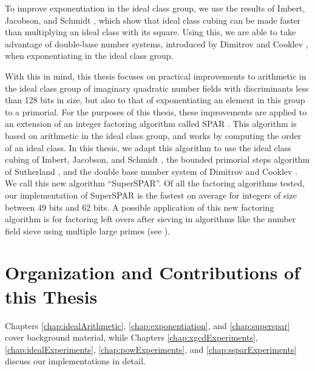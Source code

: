 \documentclass{ucalgthes1}
\theoremstyle{definition}
\begin{document}
To improve exponentiation in the ideal class group, we use the results of Imbert, Jacobson, and Schmidt \cite{Imbert2010}, which show that ideal class cubing can be made faster than multiplying an ideal class with its square.  Using this, we are able to take advantage of double-base number systems, introduced by Dimitrov and Cooklev \cite{Dimitrov1995a, Dimitrov1995b}, when exponentiating in the ideal class group.  

With this in mind, this thesis focuses on practical improvements to arithmetic in the ideal class group of imaginary quadratic number fields with discriminants less than 128 bits in size, but also to that of exponentiating an element in this group to a primorial.  For the purposes of this thesis, these improvements are applied to an extension of an integer factoring algorithm called SPAR \cite{Schnorr1984}.  This algorithm is based on arithmetic in the ideal class group, and works by computing the order of an ideal class.  In this thesis, we adapt this algorithm to use the ideal class cubing of Imbert, Jacobson, and Schmidt \cite{Imbert2010}, the bounded primorial steps algorithm of Sutherland \cite{Sutherland2007}, and the double base number system of Dimitrov and Cooklev \cite{Dimitrov1995a, Dimitrov1995b}.  We call this new algorithm ``SuperSPAR''.  Of all the factoring algorithms tested, our implementation of SuperSPAR is the fastest on average for integers of size between 49 bits and 62 bits.  A possible application of this new factoring algorithm is for factoring left overs after sieving in algorithms like the number field sieve using multiple large primes (see \cite[\S 6.1.4]{Crandall2001}).


\section{Organization and Contributions of this Thesis}

Chapters \ref{chap:idealArithmetic}, \ref{chap:exponentiation}, and \ref{chap:superspar} cover background material, while Chapters \ref{chap:xgcdExperiments}, \ref{chap:idealExperiments}, \ref{chap:powExperiments}, and \ref{chap:ssparExperiments} discuss our implementations in detail.
\end{document}

